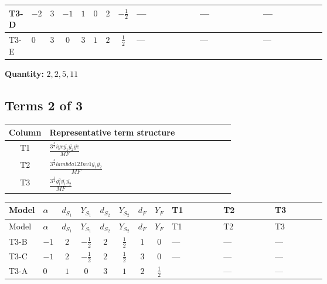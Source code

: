 \documentclass[8pt]{article}
\begin{document}
\begin{landscape}
\begin{longtable}{@{}llcccccc >{\raggedright\arraybackslash}p{0.21\linewidth} >{\raggedright\arraybackslash}p{0.21\linewidth} >{\raggedright\arraybackslash}p{0.21\linewidth}@{}}
\midrule
T3-D & $-2$ & $3$ & $-1$ & $1$ & $0$ & $2$ & $-\frac{1}{2}$ & --- & --- & --- \\
\midrule
T3-E & $0$ & $3$ & $0$ & $3$ & $1$ & $2$ & $\frac{1}{2}$ & --- & --- & --- \\
\midrule
\bottomrule
\end{longtable}
\clearpage
\noindent\textbf{Quantity: }$\mathrm{2,2,5,11}$\par\smallskip
\subsection*{Terms 2 of 3}
\begin{center}
\begin{tabular}{@{}c >{\raggedright\arraybackslash}p{0.82\linewidth}@{}}
\toprule
Column & Representative term structure \\
\midrule
T1 & \(\displaystyle \frac{3^{\frac{3}{4}} i ye \overline{y_{1}} \overline{y_{2}} \overline{ye}}{MF}\) \\
\midrule
T2 & \(\displaystyle \frac{3^{\frac{3}{4}} lambda12Inv1 \overline{y_{1}} \overline{y_{2}}}{MF}\) \\
\midrule
T3 & \(\displaystyle \frac{3^{\frac{3}{4}} g_{1}^{2} \overline{y_{1}} \overline{y_{2}}}{MF}\) \\
\midrule
\bottomrule
\end{tabular}
\end{center}
\smallskip
\tiny
\begin{longtable}{@{}llcccccc >{\raggedright\arraybackslash}p{0.21\linewidth} >{\raggedright\arraybackslash}p{0.21\linewidth} >{\raggedright\arraybackslash}p{0.21\linewidth}@{}}
\toprule
Model & $\alpha$ & $d_{S_1}$ & $Y_{S_1}$ & $d_{S_2}$ & $Y_{S_2}$ & $d_F$ & $Y_F$ & T1 & T2 & T3 \\
\midrule
\endfirsthead
\toprule
Model & $\alpha$ & $d_{S_1}$ & $Y_{S_1}$ & $d_{S_2}$ & $Y_{S_2}$ & $d_F$ & $Y_F$ & T1 & T2 & T3 \\
\midrule
\endhead
T3-B & $-1$ & $2$ & $-\frac{1}{2}$ & $2$ & $\frac{1}{2}$ & $1$ & $0$ & --- & --- & --- \\
\midrule
T3-C & $-1$ & $2$ & $-\frac{1}{2}$ & $2$ & $\frac{1}{2}$ & $3$ & $0$ & --- & --- & --- \\
\midrule
T3-A & $0$ & $1$ & $0$ & $3$ & $1$ & $2$ & $\frac{1}{2}$ & \scriptsize\adjustbox{max width=\linewidth}{$\begin{gathered} \frac{3^{\frac{3}{4}} i ye \overline{y_{1}} \overline{y_{2}} \overline{ye}}{12 MF}\end{gathered}$} & --- & --- \\

\end{longtable}
\end{landscape}
\end{document}
